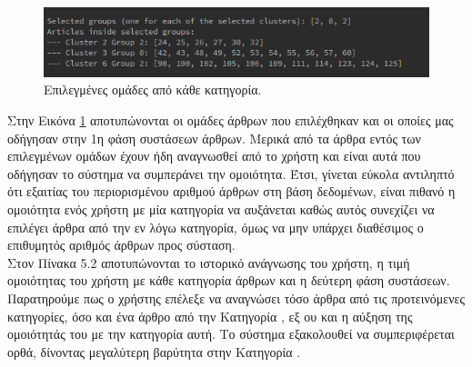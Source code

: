 \begin{figure}[!ht] \centering
\centerline{
    \includegraphics[scale=0.7]{static/figures/peloma/select3.png}}
    \caption{Επιλεγμένες ομάδες από κάθε κατηγορία.}
    \label{fig:select1}
\end{figure} 

Στην Εικόνα \ref{fig:select1} αποτυπώνονται οι ομάδες άρθρων που επιλέχθηκαν και οι οποίες μας οδήγησαν 
στην 1η φάση συστάσεων άρθρων. Μερικά από τα άρθρα εντός των επιλεγμένων ομάδων έχουν ήδη 
αναγνωσθεί από το χρήστη και είναι αυτά που οδήγησαν το σύστημα να συμπεράνει την ομοιότητα. 
Έτσι, γίνεται εύκολα αντιληπτό ότι εξαιτίας του περιορισμένου αριθμού άρθρων στη βάση δεδομένων, 
είναι πιθανό η ομοιότητα ενός χρήστη με μία κατηγορία να αυξάνεται καθώς αυτός συνεχίζει να 
επιλέγει άρθρα από την εν λόγω κατηγορία, όμως να μην υπάρχει διαθέσιμος ο επιθυμητός αριθμός 
άρθρων προς σύσταση. \\

Στον Πίνακα 5.2 αποτυπώνονται το ιστορικό ανάγνωσης του χρήστη, 
η τιμή ομοιότητας του χρήστη με κάθε κατηγορία άρθρων και η δεύτερη φάση συστάσεων. 
Παρατηρούμε πως ο χρήστης επέλεξε να αναγνώσει τόσο άρθρα από τις προτεινόμενες κατηγορίες, 
όσο και ένα άρθρο από την Κατηγορία {}, εξ ου και η αύξηση της ομοιότητάς του με την κατηγορία αυτή. 
Το σύστημα εξακολουθεί να συμπεριφέρεται ορθά, δίνοντας μεγαλύτερη βαρύτητα στην Κατηγορία {}. \\



